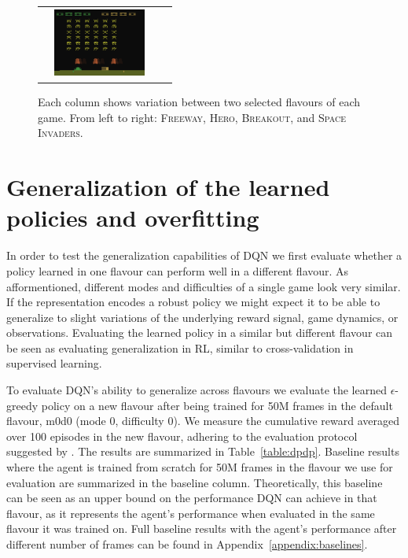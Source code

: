 \documentclass{article}
\begin{document}
\begin{figure}[t]
\begin{tabular}{cccc}
        & \includegraphics[height=0.9in, width=1.2in]{figures/alemodes/space_invaders_m1.png}
    \end{tabular}
    \caption{Each column shows variation between two selected flavours of each game. From left to right: \textsc{Freeway}, \textsc{Hero}, \textsc{Breakout}, and \textsc{Space Invaders}.}
    \label{fig:alemodes}
\end{figure}



\section{Generalization of the learned policies and overfitting}


In order to test the generalization capabilities of DQN we first evaluate whether a policy learned in one flavour can perform well in a different flavour. As afformentioned, different modes and difficulties of a single game look very similar.
If the representation encodes a robust policy we might expect it to be able to generalize to slight variations of the underlying reward signal, game dynamics, or observations.
Evaluating the learned policy in a similar but different flavour can be seen as evaluating generalization in RL, similar to cross-validation in supervised learning.

To evaluate DQN's ability to generalize across flavours we evaluate the learned $\epsilon$-greedy policy on a new flavour after being trained for 50M frames in the default flavour, m0d0 (mode 0, difficulty 0). We measure the cumulative reward averaged over 100 episodes in the new flavour, adhering to the evaluation protocol suggested by \cite{Machado18}. The results are summarized in Table~\ref{table:dpdp}.
Baseline results where the agent is trained from scratch for 50M frames in the flavour we use for evaluation are summarized in the baseline column.
Theoretically, this baseline can be seen as an upper bound on the performance DQN can achieve in that flavour, as it represents the agent's performance when evaluated in the same flavour it was trained on.
Full baseline results with the agent's performance after different number of frames can be found in Appendix~\ref{appendix:baselines}.
\end{document}
